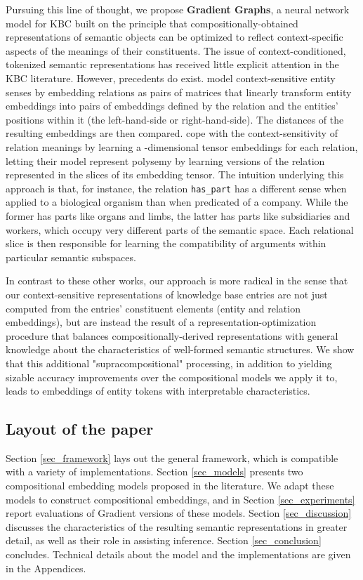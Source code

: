 \documentclass[a4paper,10pt]{article}
\begin{document}
Pursuing this line of thought, we propose \textbf{Gradient Graphs}, a neural network model for KBC built on the principle that compositionally-obtained representations of semantic objects can be optimized to reflect context-specific aspects of the meanings of their constituents. The issue of context-conditioned, tokenized semantic representations has received little explicit attention in the KBC literature. However, precedents do exist. \citet{bordes2011transe} model context-sensitive entity senses by embedding relations as pairs of matrices  that linearly transform entity embeddings into pairs of embeddings defined by the relation and the entities' positions within it (the left-hand-side or right-hand-side). The distances of the resulting embeddings are then compared. \citet{socher2013neuraltensor} cope with the context-sensitivity of relation meanings by learning a -dimensional tensor embeddings for each relation, letting their model represent polysemy by learning  versions of the relation represented in the  slices of its embedding tensor. The intuition underlying this approach is that, for instance, the relation \texttt{has\_{}part} has a different sense when applied to a biological organism than when predicated of a company. While the former has parts like organs and limbs, the latter has parts like subsidiaries and workers, which occupy very different parts of the semantic space. Each relational slice is then responsible for learning the compatibility of arguments within particular semantic subspaces.

In contrast to these other works, our approach is more radical in the sense that our context-sensitive representations of knowledge base entries are not just computed from the entries' constituent elements (entity and relation embeddings), but are instead the result of a representation-optimization procedure that balances compositionally-derived representations with general knowledge about the characteristics of well-formed semantic structures. We show that this additional "supracompositional" processing, in addition to yielding sizable accuracy improvements over the compositional models we apply it to, leads to embeddings of entity tokens with interpretable characteristics.

\subsection{Layout of the paper} 

Section \ref{sec_framework} lays out the general framework, which is compatible with a variety of implementations. Section \ref{sec_models} presents two compositional embedding models proposed in the literature. We adapt these models to construct compositional embeddings, and in Section \ref{sec_experiments} report evaluations of Gradient versions of these models. Section \ref{sec_discussion} discusses the characteristics of the resulting semantic representations in greater detail, as well as their role in assisting inference. Section \ref{sec_conclusion} concludes. Technical details about the model and the implementations are given in the Appendices.
\end{document}
